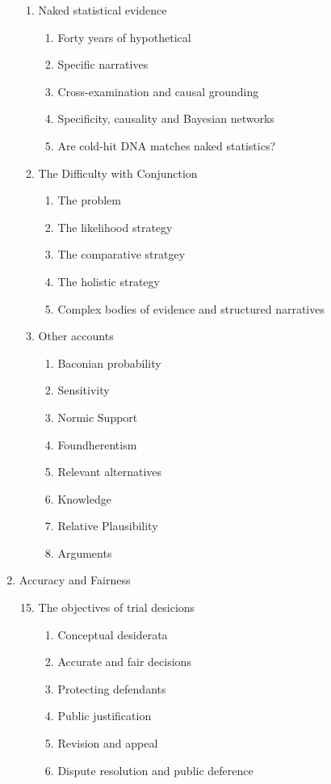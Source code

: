 \documentclass[
  10pt,
  dvipsnames,enabledeprecatedfontcommands]{scrartcl}
\begin{document}
\begin{multicols}{2}
\begin{enumerate}
\begin{enumerate}
\item  Naked statistical evidence
  \begin{enumerate}
  \item  Forty years of hypothetical
  \item  Specific narratives
  \item  Cross-examination and causal grounding
  \item  Specificity, causality and Bayesian networks 
  \item  Are cold-hit DNA matches naked statistics?
  \end{enumerate}
  
  
\item  The Difficulty with Conjunction
  \begin{enumerate}
  \item  The problem
  \item  The likelihood strategy
  \item  The comparative stratgey
  \item  The holistic strategy
  \item  Complex bodies of evidence and structured narratives
  \end{enumerate}  

 \item  Other accounts 
  \begin{enumerate}
  \item  Baconian probability
  \item  Sensitivity
  \item  Normic Support
  \item  Foundherentism
  \item  Relevant alternatives
  \item  Knowledge
  \item  Relative Plausibility
  \item  Arguments
  \end{enumerate}

\end{enumerate}
\item  Accuracy and Fairness
\begin{enumerate}

\setcounter{enumii}{14}
  \item  The objectives of trial desicions
  \begin{enumerate}
  \item  Conceptual desiderata
  \item  Accurate and fair decisions
  \item  Protecting defendants
  \item  Public justification 
  \item  Revision and appeal
  \item  Dispute resolution and public deference
  \end{enumerate}





\end{enumerate}
\end{enumerate}
\end{multicols}
\end{document}
